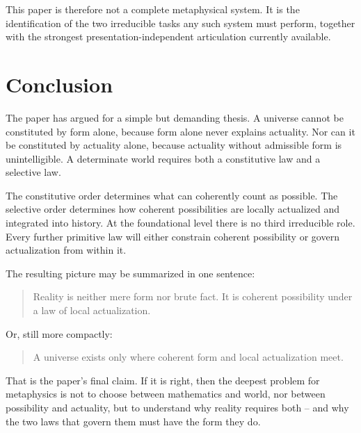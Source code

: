 \documentclass[11pt]{article}
\theoremstyle{foundation}
\begin{document}
This paper is therefore not a complete metaphysical system. It is the identification of the two irreducible tasks any such system must perform, together with the strongest presentation-independent articulation currently available.

\section{Conclusion}

The paper has argued for a simple but demanding thesis. A universe cannot be constituted by form alone, because form alone never explains actuality. Nor can it be constituted by actuality alone, because actuality without admissible form is unintelligible. A determinate world requires both a constitutive law and a selective law.

The constitutive order determines what can coherently count as possible. The selective order determines how coherent possibilities are locally actualized and integrated into history. At the foundational level there is no third irreducible role. Every further primitive law will either constrain coherent possibility or govern actualization from within it.

The resulting picture may be summarized in one sentence:

\begin{quote}
Reality is neither mere form nor brute fact. It is coherent possibility under a law of local actualization.
\end{quote}

Or, still more compactly:

\begin{quote}
A universe exists only where coherent form and local actualization meet.
\end{quote}

That is the paper's final claim. If it is right, then the deepest problem for metaphysics is not to choose between mathematics and world, nor between possibility and actuality, but to understand why reality requires both -- and why the two laws that govern them must have the form they do.



\end{document}
